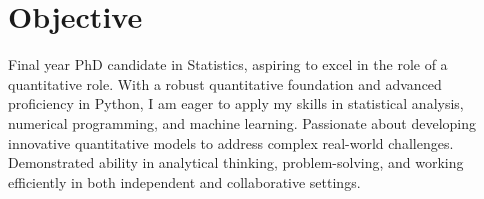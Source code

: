 \section{Objective}
Final year PhD candidate in Statistics, aspiring to excel in the role of a quantitative role. With a robust quantitative foundation and advanced proficiency in Python, I am eager to apply my skills in statistical analysis, numerical programming, and machine learning. Passionate about developing innovative quantitative models to address complex real-world challenges. Demonstrated ability in analytical thinking, problem-solving, and working efficiently in both independent and collaborative settings.


